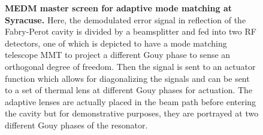 	\begin{figure}[h]
		\centering
		\caption[MEDM master screen for adaptive mode matching at Syracuse.]
		{\textbf{MEDM master screen for adaptive mode matching at Syracuse.}  
			Here, the demodulated error signal in reflection of the Fabry-Perot cavity is divided by a beamsplitter and fed into two RF detectors, one of which is depicted to have a mode matching telescope MMT to project a different Gouy phase to sense an orthogonal degree of freedom. Then the signal is sent to an actuator function which allows for diagonalizing the signals and can be sent to a set of thermal lens at different Gouy phases for actuation.  The adaptive lenses are actually placed in the beam path before entering the cavity but for demonstrative purposes, they are portrayed at two different Gouy phases of the resonator.
		}
		\label{fig:AMM_Master}
	\end{figure}

